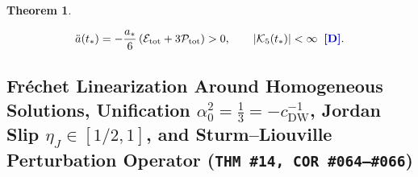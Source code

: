 \documentclass[11pt,a4paper]{article}
\newcommand{\catD}{\text{\textbf{\textcolor{blue!75!black}{[D]}}}}
\theoremstyle{definition}
\theoremstyle{plain}
\newtheorem{theorem}[axiom]{Theorem}
\theoremstyle{remark}
\begin{document}
\begin{theorem}
\begin{enumerate}[label=(\roman*)]
  \begin{equation}\label{eq:c5_nonsingular_bounce}
  \ddot{a}(t_*) = -\frac{a_*}{6}\left(\mathcal{E}_{\mathrm{tot}} + 3\mathcal{P}_{\mathrm{tot}}\right) > 0, \qquad \left|\mathcal{K}_5(t_*)\right| < \infty \;\;\catD.
  \end{equation}
\end{enumerate}
\end{theorem}

\subsection{\texorpdfstring{Fr\'echet Linearization Around Homogeneous Solutions, Unification $\alpha_0^2 = \frac{1}{3} = -c_{\mathrm{DW}}^{-1}$, Jordan Slip $\eta_J \in [1/2, 1]$, and Sturm--Liouville Perturbation Operator (\texttt{THM~\#14, COR~\#064--\#066})}{Frechet Linearization Around Homogeneous Solutions, Unification alpha\_0\^2 = 1/3, Jordan Slip, and Sturm-Liouville Perturbation Operator}}
\end{document}
